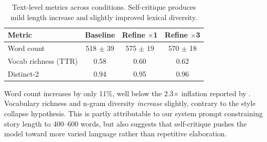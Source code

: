 \begin{table}[t]
\centering
\caption{Text-level metrics across conditions. Self-critique produces mild length increase and slightly improved lexical diversity.}
\label{tab:hacking}
\begin{tabular}{@{}lccc@{}}
\toprule
\textbf{Metric} & \textbf{Baseline} & \textbf{Refine $\times$1} & \textbf{Refine $\times$3} \\
\midrule
Word count & 518 $\pm$ 39 & 575 $\pm$ 19 & 570 $\pm$ 18 \\
Vocab richness (TTR) & 0.58 & 0.60 & 0.62 \\
Distinct-2 & 0.94 & 0.95 & 0.96 \\
\bottomrule
\end{tabular}
\end{table}

Word count increases by only 11\%, well below the 2.3$\times$ inflation reported by \citet{yuan2024selfrewarding}.
Vocabulary richness and n-gram diversity \emph{increase} slightly, contrary to the style collapse hypothesis.
This is partly attributable to our system prompt constraining story length to 400--600 words, but also suggests that self-critique pushes the model toward more varied language rather than repetitive elaboration.
